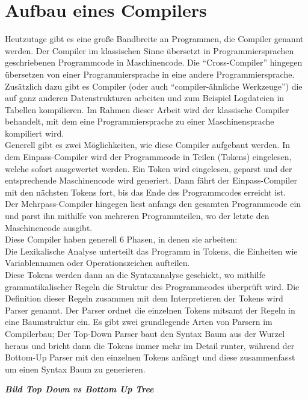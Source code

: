 \section{Aufbau eines Compilers}

Heutzutage gibt es eine große Bandbreite an Programmen, die Compiler genannt werden.
Der Compiler im klassischen Sinne übersetzt in Programmiersprachen geschriebenen Programmcode in Maschinencode.
Die ``Cross-Compiler'' hingegen übersetzen von einer Programmiersprache in eine andere Programmiersprache.
Zusätzlich dazu gibt es Compiler (oder auch ``compiler-ähnliche Werkzeuge'') die auf ganz anderen Datenstrukturen arbeiten und zum Beispiel Logdateien in Tabellen kompilieren.
Im Rahmen dieser Arbeit wird der klassische Compiler behandelt, mit dem eine Programmiersprache zu einer Maschinensprache kompiliert wird.\\
Generell gibt es zwei Möglichkeiten, wie diese Compiler aufgebaut werden.
In dem Einpass-Compiler wird der Programmcode in Teilen (Tokens) eingelesen, welche sofort ausgewertet werden.
Ein Token wird eingelesen, geparst und der entsprechende Maschinencode wird generiert.
Dann fährt der Einpass-Compiler mit den nächsten Tokens fort, bis das Ende des Programmcodes erreicht ist.\\
Der Mehrpass-Compiler hingegen liest anfangs den gesamten Programmcode ein und parst ihn mithilfe von mehreren Programmteilen, wo der letzte den Maschinencode ausgibt\cite{mossenbock:2024}.\\
Diese Compiler haben generell 6 Phasen, in denen sie arbeiten:\\
Die Lexikalische Analyse unterteilt das Programm in Tokens, die Einheiten wie Variablennamen oder Operationszeichen aufteilen.\\
Diese Tokens werden dann an die Syntaxanalyse geschickt, wo mithilfe grammatikalischer Regeln die Struktur des Programmcodes überprüft wird.
Die Definition dieser Regeln zusammen mit dem Interpretieren der Tokens wird Parser genannt.
Der Parser ordnet die einzelnen Tokens mitsamt der Regeln in eine Baumstruktur ein.
Es gibt zwei grundlegende Arten von Parsern im Compilerbau;
Der Top-Down Parser baut den Syntax Baum aus der Wurzel heraus und bricht dann die Tokens immer mehr im Detail runter, während der Bottom-Up Parser mit den einzelnen Tokens anfängt und diese zusammenfasst um einen Syntax Baum zu generieren\cite{meduna2007elements}.

\textbf{\textit{Bild Top Down vs Bottom Up Tree}}

